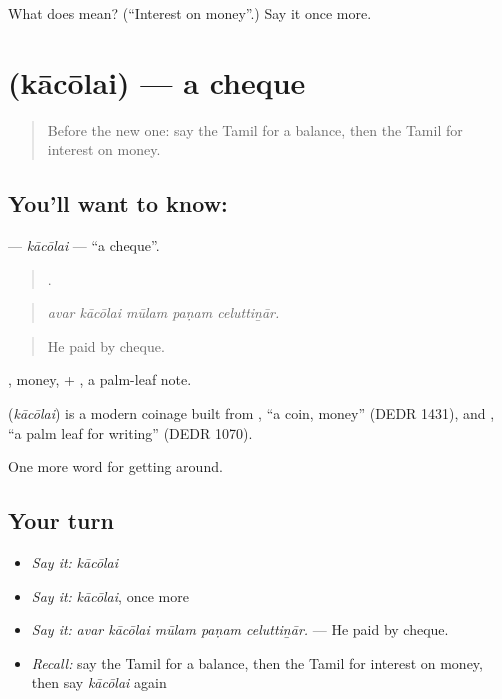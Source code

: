 \begin{tcolorbox}[breakable,colback=teal!4,colframe=teal!35!black,title={Before you move on}]
What does  mean? (\textquotedblleft{}Interest on money\textquotedblright{}.) Say it once more.
\end{tcolorbox}
\section[\texorpdfstring{\ta{காசோலை} (kācōlai)}{காசோலை (kācōlai)}]{ (kācōlai) — a cheque}

\label{lesson:TA-C446-kacolai}



\begin{quote}
Before the new one: say the Tamil for a balance, then the Tamil for interest on money.
\end{quote}

\subsection*{You'll want to know: }
\textbf{} — \emph{kācōlai} — \textquotedblleft{}a cheque\textquotedblright{}.

\begin{quote}
    .
\end{quote}

\begin{quote}
\emph{avar kācōlai mūlam paṇam celuttiṉār.}
\end{quote}

\begin{quote}
He paid by cheque.
\end{quote}

, money, + , a palm-leaf note.

\begin{cousinweb}
\textbf{} (\emph{kācōlai}) is a modern coinage built from , \textquotedblleft{}a coin, money\textquotedblright{} (DEDR 1431), and , \textquotedblleft{}a palm leaf for writing\textquotedblright{} (DEDR 1070).
\end{cousinweb}

\begin{grammarlens}[title={What you've built}]
One more word for getting around.
\end{grammarlens}

\subsection*{Your turn}
\begin{itemize}
\raggedright
  \item \emph{Say it:} \emph{kācōlai}
  \item \emph{Say it:} \emph{kācōlai}, once more
  \item \emph{Say it:} \emph{avar kācōlai mūlam paṇam celuttiṉār.} — He paid by cheque.
  \item \emph{Recall:} say the Tamil for a balance, then the Tamil for interest on money, then say \emph{kācōlai} again
\end{itemize}

